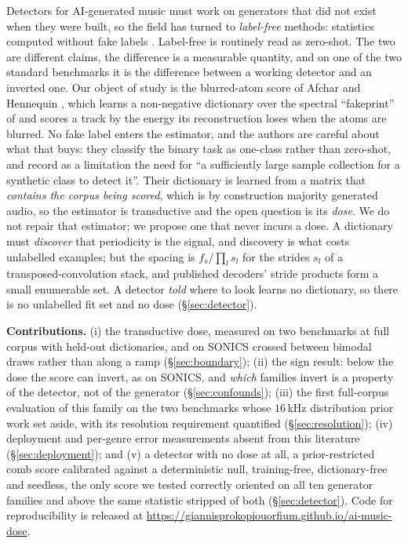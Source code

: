 \documentclass{article}
\begin{document}
Detectors for AI-generated music must work on generators that did not exist when
they were built, so the field has turned to \emph{label-free} methods:
statistics computed without fake labels
\cite{afchar2026finding,han2026musicdet,li2024pathway}. Label-free is routinely
read as zero-shot. The two are different claims, the difference is a measurable
quantity, and on one of the two standard benchmarks it is the difference between
a working detector and an inverted one. Our object of study is the blurred-atom score of Afchar and Hennequin
\cite{afchar2026finding}, which learns a non-negative dictionary
\cite{lee1999nmf} over the spectral ``fakeprint'' of \cite{afchar2025fourier}
and scores a track by the energy its reconstruction loses when the atoms are
blurred. No fake label enters the estimator, and the authors are careful about
what that buys: they classify the binary task as one-class rather than zero-shot,
and record as a limitation the need for ``a sufficiently large sample collection for
a synthetic class to detect it''. Their dictionary is learned from a matrix that \emph{contains the corpus
being scored}, which is by construction majority generated audio, so the
estimator is transductive and the open question is its \emph{dose}. We do not repair that estimator; we propose one that never incurs a dose. A
dictionary must \emph{discover} that periodicity is the signal, and discovery is
what costs unlabelled examples; but the spacing is $f_s/\prod_l s_l$ for the
strides $s_l$ of a transposed-convolution stack, and published decoders' stride
products form a small enumerable set. A detector \emph{told} where to look learns no
dictionary, so there is no unlabelled fit set and no dose (\S\ref{sec:detector}).

\noindent\textbf{Contributions.} (i) the transductive dose, measured on two
benchmarks at full corpus with held-out dictionaries, and on SONICS \cite{rahman2025sonics} crossed between
bimodal draws rather than along a ramp (\S\ref{sec:boundary}); (ii) the sign result: below the dose
the score can invert, as on SONICS, and \emph{which} families invert is a property of the
detector, not of the generator (\S\ref{sec:confounds}); (iii) the first full-corpus
evaluation of this family on the two benchmarks whose $16$\,kHz distribution prior
work set aside, with its resolution requirement quantified (\S\ref{sec:resolution}); (iv) deployment and per-genre error measurements absent from this
literature (\S\ref{sec:deployment}); and (v) a detector with no dose at all, a
prior-restricted comb score calibrated against a deterministic null, training-free,
dictionary-free and seedless, the only score we tested correctly oriented on all
ten generator families and above the same statistic stripped of both
(\S\ref{sec:detector}). Code for reproducibility is released at
\url{https://giannisprokopiouorfium.github.io/ai-music-dose}.
\end{document}
